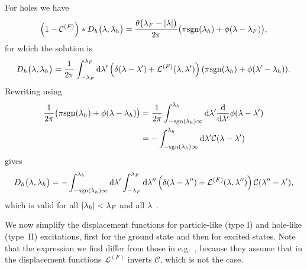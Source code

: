 \documentclass[11pt, a4paper]{report} %
\begin{document}
For holes we have 
\begin{align}
  \label{eq:37}
  \qty(1-\mathcal{C}^{(F)})* D_h\qty\big(\lambda,\lambda_h) = \frac{\theta\qty\big(\lambda_F-\abs{\lambda})}{2\pi} \qty\big(\pi\mathrm{sgn}\qty(\lambda_h) + \phi\qty(\lambda-\lambda_F)),
\end{align}
for which the solution is 
\begin{align}
  \label{eq:38}
  D_h\qty\big(\lambda,\lambda_h) = \frac{1}{2\pi} \int_{-\lambda_F}^{\lambda_F} \dd \lambda' \left(\delta\qty(\lambda-\lambda')+\mathcal{L}^{(F)}\qty(\lambda,\lambda')\right)\qty(\pi\mathrm{sgn}\qty(\lambda_h) + \phi\qty(\lambda'-\lambda_h)).
\end{align}
Rewriting using
\begin{align}
  \label{eq:39}
  \frac{1}{2\pi} \qty\big(\pi \mathrm{sgn}(\lambda_h) + \phi(\lambda-\lambda_h)) &= \frac{1}{2\pi} \int_{-\mathrm{sgn}\qty(\lambda_h)\infty}^{\lambda_h} \dd \lambda' \frac{\dd}{\dd\lambda'} \phi\qty(\lambda - \lambda') \\
                                                                         &= - \int_{-\mathrm{sgn}\qty(\lambda_h)\infty}^{\lambda_h} \dd \lambda' \mathcal{C}\qty(\lambda-\lambda')
\end{align}
gives
\begin{align}
  \label{eq:40}
  D_h\qty\big(\lambda, \lambda_h) = - \int_{-\textrm{sgn}(\lambda_h)\infty}^{\lambda_h} \dd \lambda' \int_{-\lambda_F}^{\lambda_F} \dd \lambda'' \left(\delta\qty(\lambda-\lambda'') + \mathcal{L}^{(F)}\qty(\lambda,\lambda'') \right)\mathcal{C}\qty(\lambda''-\lambda'),
\end{align}
which is valid for all \(\abs{\lambda_h}<\lambda_F\) and all \(\lambda\)~\cite{Caux2015}.

We now simplify the displacement functions for particle-like (type I) and hole-like (type~II) excitations, first for the ground state and then for excited states.
Note that the expression we find differ from those in e.g.~\cite{Korepin1993}, because they assume that in the displacement functions \(\mathcal{L}^{(F)}\) inverts \(\mathcal{C}\), which is not the case.
\end{document}
